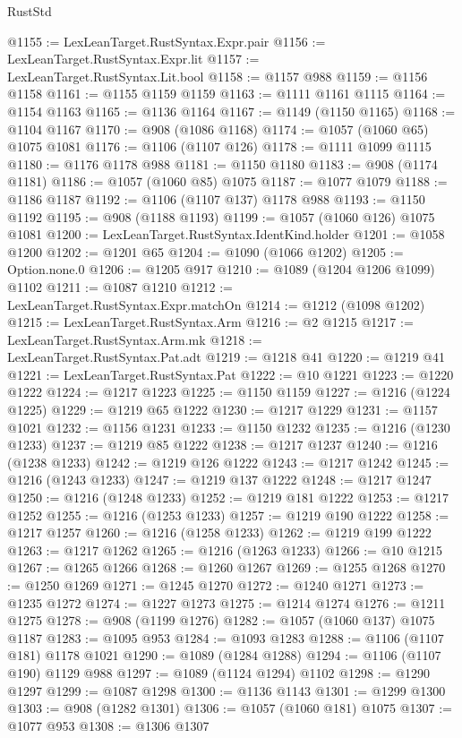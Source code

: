 \begin{lexlean}{RustStd}
\begin{coremodule}
@1155 := LexLeanTarget.RustSyntax.Expr.pair
@1156 := LexLeanTarget.RustSyntax.Expr.lit
@1157 := LexLeanTarget.RustSyntax.Lit.bool
@1158 := @1157 @988
@1159 := @1156 @1158
@1161 := @1155 @1159 @1159
@1163 := @1111 @1161 @1115
@1164 := @1154 @1163
@1165 := @1136 @1164
@1167 := @1149 (@1150 @1165)
@1168 := @1104 @1167
@1170 := @908 (@1086 @1168)
@1174 := @1057 (@1060 @65) @1075 @1081
@1176 := @1106 (@1107 @126)
@1178 := @1111 @1099 @1115
@1180 := @1176 @1178 @988
@1181 := @1150 @1180
@1183 := @908 (@1174 @1181)
@1186 := @1057 (@1060 @85) @1075
@1187 := @1077 @1079
@1188 := @1186 @1187
@1192 := @1106 (@1107 @137) @1178 @988
@1193 := @1150 @1192
@1195 := @908 (@1188 @1193)
@1199 := @1057 (@1060 @126) @1075 @1081
@1200 := LexLeanTarget.RustSyntax.IdentKind.holder
@1201 := @1058 @1200
@1202 := @1201 @65
@1204 := @1090 (@1066 @1202)
@1205 := Option.none.{0}
@1206 := @1205 @917
@1210 := @1089 (@1204 @1206 @1099) @1102
@1211 := @1087 @1210
@1212 := LexLeanTarget.RustSyntax.Expr.matchOn
@1214 := @1212 (@1098 @1202)
@1215 := LexLeanTarget.RustSyntax.Arm
@1216 := @2 @1215
@1217 := LexLeanTarget.RustSyntax.Arm.mk
@1218 := LexLeanTarget.RustSyntax.Pat.adt
@1219 := @1218 @41
@1220 := @1219 @41
@1221 := LexLeanTarget.RustSyntax.Pat
@1222 := @10 @1221
@1223 := @1220 @1222
@1224 := @1217 @1223
@1225 := @1150 @1159
@1227 := @1216 (@1224 @1225)
@1229 := @1219 @65 @1222
@1230 := @1217 @1229
@1231 := @1157 @1021
@1232 := @1156 @1231
@1233 := @1150 @1232
@1235 := @1216 (@1230 @1233)
@1237 := @1219 @85 @1222
@1238 := @1217 @1237
@1240 := @1216 (@1238 @1233)
@1242 := @1219 @126 @1222
@1243 := @1217 @1242
@1245 := @1216 (@1243 @1233)
@1247 := @1219 @137 @1222
@1248 := @1217 @1247
@1250 := @1216 (@1248 @1233)
@1252 := @1219 @181 @1222
@1253 := @1217 @1252
@1255 := @1216 (@1253 @1233)
@1257 := @1219 @190 @1222
@1258 := @1217 @1257
@1260 := @1216 (@1258 @1233)
@1262 := @1219 @199 @1222
@1263 := @1217 @1262
@1265 := @1216 (@1263 @1233)
@1266 := @10 @1215
@1267 := @1265 @1266
@1268 := @1260 @1267
@1269 := @1255 @1268
@1270 := @1250 @1269
@1271 := @1245 @1270
@1272 := @1240 @1271
@1273 := @1235 @1272
@1274 := @1227 @1273
@1275 := @1214 @1274
@1276 := @1211 @1275
@1278 := @908 (@1199 @1276)
@1282 := @1057 (@1060 @137) @1075 @1187
@1283 := @1095 @953
@1284 := @1093 @1283
@1288 := @1106 (@1107 @181) @1178 @1021
@1290 := @1089 (@1284 @1288)
@1294 := @1106 (@1107 @190) @1129 @988
@1297 := @1089 (@1124 @1294) @1102
@1298 := @1290 @1297
@1299 := @1087 @1298
@1300 := @1136 @1143
@1301 := @1299 @1300
@1303 := @908 (@1282 @1301)
@1306 := @1057 (@1060 @181) @1075
@1307 := @1077 @953
@1308 := @1306 @1307

\end{coremodule}
\end{lexlean}
